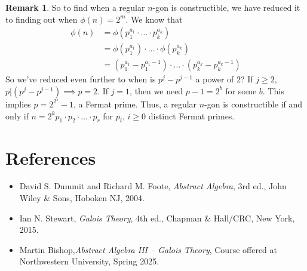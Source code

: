 \documentclass{article}
\theoremstyle{plain}
\theoremstyle{definition}
\newtheorem{rem}{Remark}
\begin{document}
\begin{rem}
    So to find when a regular $n$-gon is constructible, we have reduced it to finding out when $\phi(n) = 2^m$. We know that \begin{align}
        \phi(n) & = \phi(p_1^{a_1} \cdot \dots \cdot p_k^{a_k}) \\
        & = \phi(p_1^{a_1}) \cdot \dots \cdot \phi(p_k^{a_k}) \\
        & = (p_1^{a_1} - p_1^{a_1 - 1}) \cdot \dots \cdot (p_k^{a_k} - p_k^{a_k -1})
    \end{align} So we've reduced even further to when is $p^j - p^{j-1}$ a power of $2$? If $j \geq 2$, $p | (p^j - p^{j-1}) \implies p = 2$. If $j = 1$, then we need $p-1 = 2^b$ for some $b$. This implies $p = 2^{2^s} - 1$, a Fermat prime. Thus, a regular $n$-gon is constructible if and only if $n = 2^kp_1 \cdot p_2 \cdot \dots \cdot p_r$ for $p_i$, $i \geq 0$ distinct Fermat primes.
\end{rem}



\section*{References}

\begin{itemize}
    \item David S. Dummit and Richard M. Foote, \textit{Abstract Algebra}, 3rd ed., John Wiley \& Sons, Hoboken NJ, 2004.
    \item Ian N. Stewart, \textit{Galois Theory}, 4th ed., Chapman \& Hall/CRC, New York, 2015.
    \item Martin Bishop,\textit{Abstract Algebra III – Galois Theory}, Course offered at Northwestern University, Spring 2025.
\end{itemize}

\end{document}

